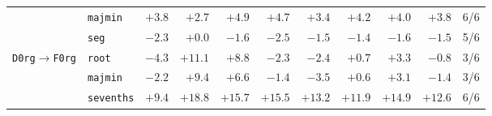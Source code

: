 \begin{table}[t]
\begin{tabular}{llrrrrrrrrr}
     & \texttt{majmin} & $+3.8$ & $+2.7$ & $+4.9$ & $+4.7$ & $+3.4$ & $+4.2$ & $+4.0$ & $+3.8$ & 6/6 \\
     & \texttt{seg} & $-2.3$ & $+0.0$ & $-1.6$ & $-2.5$ & $-1.5$ & $-1.4$ & $-1.6$ & $-1.5$ & 5/6 \\
    \addlinespace
    \texttt{D0rg}$\to$\texttt{F0rg} & \texttt{root} & $-4.3$ & $+11.1$ & $+8.8$ & $-2.3$ & $-2.4$ & $+0.7$ & $+3.3$ & $-0.8$ & 3/6 \\
     & \texttt{majmin} & $-2.2$ & $+9.4$ & $+6.6$ & $-1.4$ & $-3.5$ & $+0.6$ & $+3.1$ & $-1.4$ & 3/6 \\
     & \texttt{sevenths} & $+9.4$ & $+18.8$ & $+15.7$ & $+15.5$ & $+13.2$ & $+11.9$ & $+14.9$ & $+12.6$ & 6/6 \\
    \bottomrule
  \end{tabular}
\end{table}

